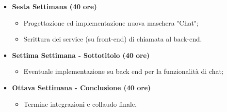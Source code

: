 {\begin{itemize}
\begin{itemize}
            \item Analisi e studio del progetto TripHippie;
            \item Progettazione ed implementazione della nuova maschera di Chat.
        \end{itemize}
        \item \textbf{Sesta Settimana (40 ore)} 
        \begin{itemize}
            \item Progettazione ed implementazione nuova maschera "Chat";
            \item Scrittura dei service (su front-end) di chiamata al back-end.
        \end{itemize}
        \item \textbf{Settima Settimana - Sottotitolo (40 ore)} 
        \begin{itemize}
            \item Eventuale implementazione su back end per la funzionalità di chat;
        \end{itemize}
        \item \textbf{Ottava Settimana - Conclusione (40 ore)} 
        \begin{itemize}
            \item Termine integrazioni e collaudo finale.
        \end{itemize}
    \end{itemize}
}

\newcommand{\totaleOre}{320}

\newcommand{\obiettiviObbligatori}{
     \item \underline{\textit{O01}}: Acquisizione competenze sulle tematiche sopra descritte;;
	 \item \underline{\textit{O02}}: Capacità di raggiungere gli obiettivi richiesti in autonomia seguendo il cronoprogramma;
	 \item \underline{\textit{O03}}: Portare a termine le implementazioni previste con una percentuale di superamento pari al 80\% (equivalente alla maschera di chat senza persistenza su back end);
	 
}

\newcommand{\obiettiviDesiderabili}{
	 \item \underline{\textit{D01}}: Portare a termine le implementazioni previste con una percentuale di superamento pari al 100\% (equivalente alla funzionalità di chat completa).
}

\newcommand{\obiettiviFacoltativi}{
	 \item \underline{\textit{F01}}: Realizzazione funzionalità di chat completa.
}